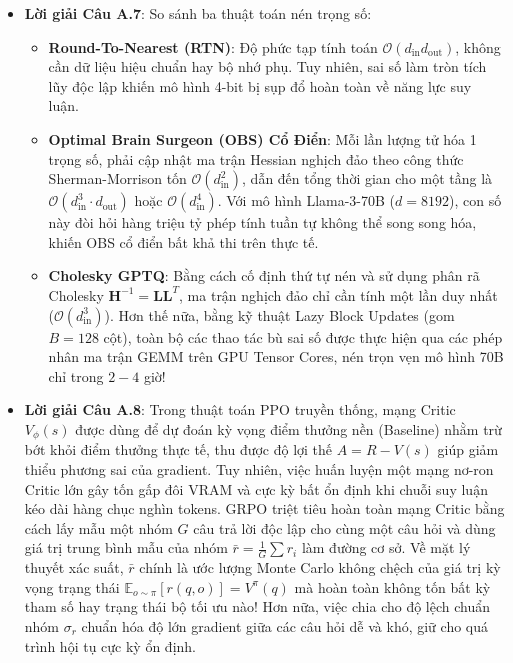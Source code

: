 \begin{itemize}
  \item \textbf{Lời giải Câu A.7}:
  So sánh ba thuật toán nén trọng số:
  \begin{itemize}
    \item \textbf{Round-To-Nearest (RTN)}: Độ phức tạp tính toán $\mathcal{O}(d_{\text{in}} d_{\text{out}})$, không cần dữ liệu hiệu chuẩn hay bộ nhớ phụ. Tuy nhiên, sai số làm tròn tích lũy độc lập khiến mô hình 4-bit bị sụp đổ hoàn toàn về năng lực suy luận.
    \item \textbf{Optimal Brain Surgeon (OBS) Cổ Điển}: Mỗi lần lượng tử hóa 1 trọng số, phải cập nhật ma trận Hessian nghịch đảo theo công thức Sherman-Morrison tốn $\mathcal{O}(d_{\text{in}}^2)$, dẫn đến tổng thời gian cho một tầng là $\mathcal{O}(d_{\text{in}}^3 \cdot d_{\text{out}})$ hoặc $\mathcal{O}(d_{\text{in}}^4)$. Với mô hình Llama-3-70B ($d = 8192$), con số này đòi hỏi hàng triệu tỷ phép tính tuần tự không thể song song hóa, khiến OBS cổ điển bất khả thi trên thực tế.
    \item \textbf{Cholesky GPTQ}: Bằng cách cố định thứ tự nén và sử dụng phân rã Cholesky $\mathbf{H}^{-1} = \mathbf{L} \mathbf{L}^T$, ma trận nghịch đảo chỉ cần tính một lần duy nhất ($\mathcal{O}(d_{\text{in}}^3)$). Hơn thế nữa, bằng kỹ thuật Lazy Block Updates (gom $B = 128$ cột), toàn bộ các thao tác bù sai số được thực hiện qua các phép nhân ma trận GEMM trên GPU Tensor Cores, nén trọn vẹn mô hình 70B chỉ trong $2 - 4$ giờ!
  \end{itemize}

  \item \textbf{Lời giải Câu A.8}:
  Trong thuật toán PPO truyền thống, mạng Critic $V_\phi(s)$ được dùng để dự đoán kỳ vọng điểm thưởng nền (Baseline) nhằm trừ bớt khỏi điểm thưởng thực tế, thu được độ lợi thế $A = R - V(s)$ giúp giảm thiểu phương sai của gradient. Tuy nhiên, việc huấn luyện một mạng nơ-ron Critic lớn gây tốn gấp đôi VRAM và cực kỳ bất ổn định khi chuỗi suy luận kéo dài hàng chục nghìn tokens.
  GRPO triệt tiêu hoàn toàn mạng Critic bằng cách lấy mẫu một nhóm $G$ câu trả lời độc lập cho cùng một câu hỏi và dùng giá trị trung bình mẫu của nhóm $\bar{r} = \frac{1}{G}\sum r_i$ làm đường cơ sở. Về mặt lý thuyết xác suất, $\bar{r}$ chính là ước lượng Monte Carlo không chệch của giá trị kỳ vọng trạng thái $\mathbb{E}_{o \sim \pi}[r(q, o)] = V^\pi(q)$ mà hoàn toàn không tốn bất kỳ tham số hay trạng thái bộ tối ưu nào! Hơn nữa, việc chia cho độ lệch chuẩn nhóm $\sigma_r$ chuẩn hóa độ lớn gradient giữa các câu hỏi dễ và khó, giữ cho quá trình hội tụ cực kỳ ổn định.


\end{itemize}
